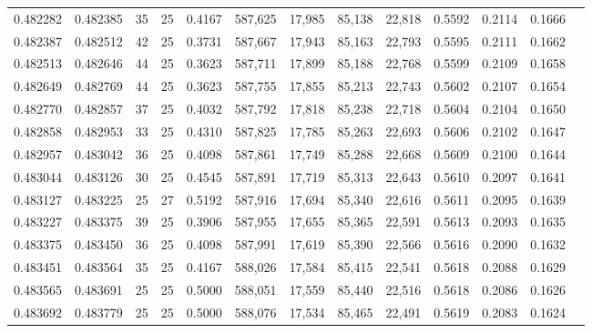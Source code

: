\begin{tabular}{rrrrrrrrrrrrr}
0.482282 & 0.482385 &    35 &  25 &                                     0.4167 & 587,625 &  17,985 &  85,138 &  22,818 & 0.5592 & 0.2114 & 0.1666 \\
0.482387 & 0.482512 &    42 &  25 &                                     0.3731 & 587,667 &  17,943 &  85,163 &  22,793 & 0.5595 & 0.2111 & 0.1662 \\
0.482513 & 0.482646 &    44 &  25 &                                     0.3623 & 587,711 &  17,899 &  85,188 &  22,768 & 0.5599 & 0.2109 & 0.1658 \\
0.482649 & 0.482769 &    44 &  25 &                                     0.3623 & 587,755 &  17,855 &  85,213 &  22,743 & 0.5602 & 0.2107 & 0.1654 \\
0.482770 & 0.482857 &    37 &  25 &                                     0.4032 & 587,792 &  17,818 &  85,238 &  22,718 & 0.5604 & 0.2104 & 0.1650 \\
0.482858 & 0.482953 &    33 &  25 &                                     0.4310 & 587,825 &  17,785 &  85,263 &  22,693 & 0.5606 & 0.2102 & 0.1647 \\
0.482957 & 0.483042 &    36 &  25 &                                     0.4098 & 587,861 &  17,749 &  85,288 &  22,668 & 0.5609 & 0.2100 & 0.1644 \\
0.483044 & 0.483126 &    30 &  25 &                                     0.4545 & 587,891 &  17,719 &  85,313 &  22,643 & 0.5610 & 0.2097 & 0.1641 \\
0.483127 & 0.483225 &    25 &  27 &                                     0.5192 & 587,916 &  17,694 &  85,340 &  22,616 & 0.5611 & 0.2095 & 0.1639 \\
0.483227 & 0.483375 &    39 &  25 &                                     0.3906 & 587,955 &  17,655 &  85,365 &  22,591 & 0.5613 & 0.2093 & 0.1635 \\
0.483375 & 0.483450 &    36 &  25 &                                     0.4098 & 587,991 &  17,619 &  85,390 &  22,566 & 0.5616 & 0.2090 & 0.1632 \\
0.483451 & 0.483564 &    35 &  25 &                                     0.4167 & 588,026 &  17,584 &  85,415 &  22,541 & 0.5618 & 0.2088 & 0.1629 \\
0.483565 & 0.483691 &    25 &  25 &                                     0.5000 & 588,051 &  17,559 &  85,440 &  22,516 & 0.5618 & 0.2086 & 0.1626 \\
0.483692 & 0.483779 &    25 &  25 &                                     0.5000 & 588,076 &  17,534 &  85,465 &  22,491 & 0.5619 & 0.2083 & 0.1624 \\

\end{tabular}
